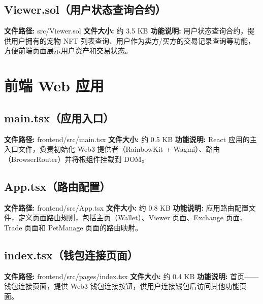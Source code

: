 \documentclass[code]{mancls}
\begin{document}


\subsection{Viewer.sol（用户状态查询合约）}
\textbf{文件路径:} src/Viewer.sol
\textbf{文件大小:} 约 3.5 KB
\textbf{功能说明:} 用户状态查询合约，提供用户拥有的宠物 NFT 列表查询、用户作为卖方/买方的交易记录查询等功能，方便前端页面展示用户资产和交易状态。



\pagebreak

\section{前端 Web 应用}

\subsection{main.tsx（应用入口）}
\textbf{文件路径:} frontend/src/main.tsx
\textbf{文件大小:} 约 0.5 KB
\textbf{功能说明:} React 应用的主入口文件，负责初始化 Web3 提供者（RainbowKit + Wagmi）、路由（BrowserRouter）并将根组件挂载到 DOM。



\subsection{App.tsx（路由配置）}
\textbf{文件路径:} frontend/src/App.tsx
\textbf{文件大小:} 约 0.8 KB
\textbf{功能说明:} 应用路由配置文件，定义页面路由规则，包括主页（Wallet）、Viewer 页面、Exchange 页面、Trade 页面和 PetManage 页面的路由映射。



\subsection{index.tsx（钱包连接页面）}
\textbf{文件路径:} frontend/src/pages/index.tsx
\textbf{文件大小:} 约 0.4 KB
\textbf{功能说明:} 首页——钱包连接页面，提供 Web3 钱包连接按钮，供用户连接钱包后访问其他功能页面。


\end{document}
